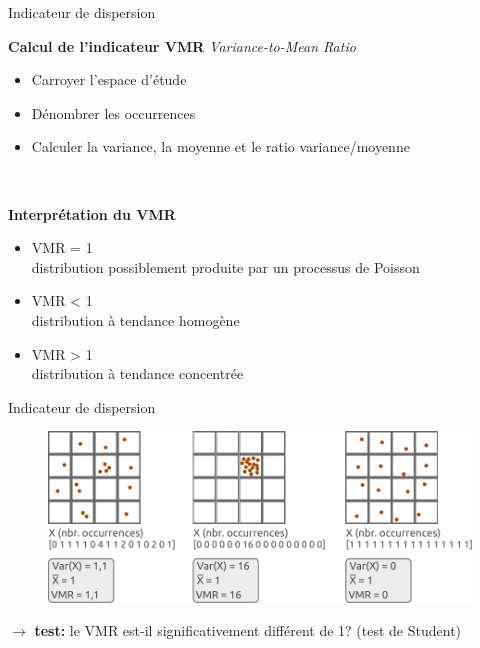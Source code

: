 \begin{frame}{Indicateur de dispersion}

\textbf{Calcul de l'indicateur VMR} \textit{Variance-to-Mean Ratio}

\begin{itemize}
\item Carroyer l'espace d'étude
\item Dénombrer les occurrences
\item Calculer la variance, la moyenne et le ratio variance/moyenne
\end{itemize}

~

\textbf{Interprétation du VMR}

\begin{itemize}
  \item VMR = 1 \\ distribution possiblement produite par un processus de Poisson
  \item VMR < 1 \\ distribution à tendance homogène
  \item VMR > 1 \\ distribution à tendance concentrée
\end{itemize}

\end{frame}


\begin{frame}{Indicateur de dispersion}

\begin{figure}
  \includegraphics[width=12cm]{VMR.pdf}
\end{figure}

$\rightarrow$ \textbf{test:} le VMR est-il significativement différent de 1? (test de Student)

\end{frame}


